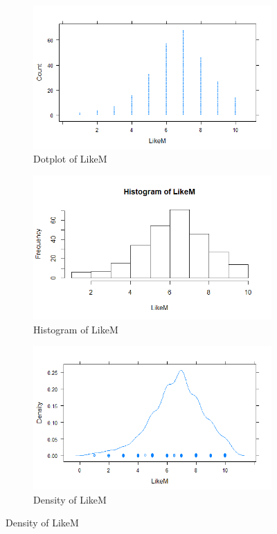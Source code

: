 \documentclass[a4paper,12pt]{article}
\begin{document}
\begin{enumerate}[label = {\alph*)}]
\begin{itemize}
					\begin{figure}[H]
						\centering
						\begin{subfigure}[b]{0.8\linewidth}
							\includegraphics[width=\linewidth]{Images/dotplot2}
							\caption{Dotplot of LikeM}
						\end{subfigure}
						\begin{subfigure}[b]{0.4\linewidth}
							\includegraphics[width=\linewidth]{Images/Rplot3}
							\caption{Histogram of LikeM}
						\end{subfigure}
						\begin{subfigure}[b]{0.4\linewidth}
							\includegraphics[width=\linewidth]{Images/denplot2}
							\caption{Density of LikeM}
						\end{subfigure}
						\label{fig:rplot3}
					\end{figure}
					

\end{itemize}
\end{enumerate}
\end{document}
